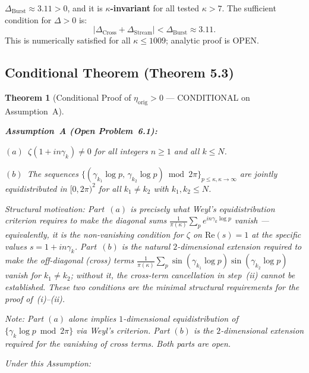 \documentclass[11pt]{article}
\newtheorem{theorem}{Theorem}[section]
\newcommand{\etaorig}{\eta_{\mathrm{orig}}}
\newcommand{\Dburstvar}{\Delta_{\mathrm{Burst}}}
\newcommand{\Dcross}{\Delta_{\mathrm{Cross}}}
\newcommand{\Dstream}{\Delta_{\mathrm{Stream}}}
\begin{document}
$\Dburstvar\approx 3.11 > 0$, and it is \textbf{$\kappa$-invariant}
for all tested $\kappa > 7$.
The sufficient condition for $\Delta > 0$ is:
\[
|\Dcross + \Dstream| < \Dburstvar \approx 3.11.
\]
This is numerically satisfied for all $\kappa\leq 1009$;
analytic proof is OPEN.

\subsection{Conditional Theorem (Theorem 5.3)}

\begin{theorem}[Conditional Proof of $\etaorig > 0$ ---
CONDITIONAL on Assumption~A]\label{thm:T5}

\textbf{Assumption~A (Open Problem~6.1):}

$(a)$~$\zeta(1+in\gamma_k)\neq 0$ for all integers $n\geq 1$
and all $k\leq N$.

$(b)$~The sequences
$\{(\gamma_{k_1}\log p,\,\gamma_{k_2}\log p)\bmod 2\pi\}_{p\leq\kappa,
\kappa\to\infty}$
are jointly equidistributed in $[0,2\pi)^2$
for all $k_1\neq k_2$ with $k_1,k_2\leq N$.

\emph{Structural motivation:}
Part~$(a)$ is precisely what Weyl's equidistribution criterion requires
to make the diagonal sums $\frac{1}{\pi(\kappa)}\sum_p e^{in\gamma_k\log p}$
vanish --- equivalently, it is the non-vanishing condition for $\zeta$ on
$\mathrm{Re}(s)=1$ at the specific values $s=1+in\gamma_k$.
Part~$(b)$ is the natural $2$-dimensional extension required to make the
off-diagonal (cross) terms
$\frac{1}{\pi(\kappa)}\sum_p\sin(\gamma_{k_1}\log p)\sin(\gamma_{k_2}\log p)$
vanish for $k_1\neq k_2$; without it, the cross-term cancellation
in step~(ii) cannot be established.
These two conditions are the minimal structural requirements for the proof
of~(i)--(ii).

\emph{Note:}
Part $(a)$ alone implies $1$-dimensional equidistribution of
$\{\gamma_k\log p\bmod 2\pi\}$ via Weyl's criterion.
Part $(b)$ is the $2$-dimensional extension required for the vanishing
of cross terms.
Both parts are open.

Under this Assumption:


\end{theorem}
\end{document}
